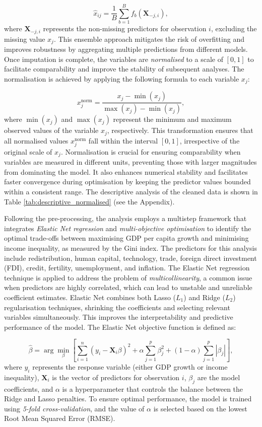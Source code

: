\documentclass[12pt]{article}
\begin{document}
\[
\hat{x}_{ij} = \frac{1}{B} \sum_{b=1}^{B} f_b(\mathbf{X}_{-j,i}),
\]
where \(\mathbf{X}_{-j,i}\) represents the non-missing predictors for observation \(i\), excluding the missing value \(x_j\). This ensemble approach mitigates the risk of overfitting and improves robustness by aggregating multiple predictions from different models. 
Once imputation is complete, the variables are \textit{normalised} to a scale of \([0, 1]\) to facilitate comparability and improve the stability of subsequent analyses. The normalisation is achieved by applying the following formula to each variable \(x_j\):

\[
x_j^{\text{norm}} = \frac{x_j - \min(x_j)}{\max(x_j) - \min(x_j)},
\]
where \(\min(x_j)\) and \(\max(x_j)\) represent the minimum and maximum observed values of the variable \(x_j\), respectively. This transformation ensures that all normalised values \(x_j^{\text{norm}}\) fall within the interval \([0, 1]\), irrespective of the original scale of \(x_j\). Normalisation is crucial for ensuring comparability when variables are measured in different units, preventing those with larger magnitudes from dominating the model. It also enhances numerical stability and facilitates faster convergence during optimisation by keeping the predictor values bounded within a consistent range. The descriptive analysis of the cleaned data is shown in Table \ref{tab:descriptive_normalised} (see the Appendix).

Following the pre-processing, the analysis employs a multistep framework that integrates \textit{Elastic Net regression} and \textit{multi-objective optimisation} to identify the optimal trade-offs between maximising GDP per capita growth and minimising income inequality, as measured by the Gini index. The predictors for this analysis include redistribution, human capital, technology, trade, foreign direct investment (FDI), credit, fertility, unemployment, and inflation. The Elastic Net regression technique is applied to address the problem of \textit{multicollinearity}, a common issue when predictors are highly correlated, which can lead to unstable and unreliable coefficient estimates. Elastic Net combines both Lasso (\(L_1\)) and Ridge (\(L_2\)) regularisation techniques, shrinking the coefficients and selecting relevant variables simultaneously. This improves the interpretability and predictive performance of the model. The Elastic Net objective function is defined as:

\[
\hat{\beta} = \arg \min_{\beta} \left[ \sum_{i=1}^{n} \left( y_i - \mathbf{X}_i \beta \right)^2 + \alpha \sum_{j=1}^{p} \beta_j^2 + (1-\alpha) \sum_{j=1}^{p} |\beta_j| \right],
\]
where \(y_i\) represents the response variable (either GDP growth or income inequality), \(\mathbf{X}_i\) is the vector of predictors for observation \(i\), \(\beta_j\) are the model coefficients, and \(\alpha\) is a hyperparameter that controls the balance between the Ridge and Lasso penalties. To ensure optimal performance, the model is trained using \textit{5-fold cross-validation}, and the value of \(\alpha\) is selected based on the lowest Root Mean Squared Error (RMSE). 
\end{document}

